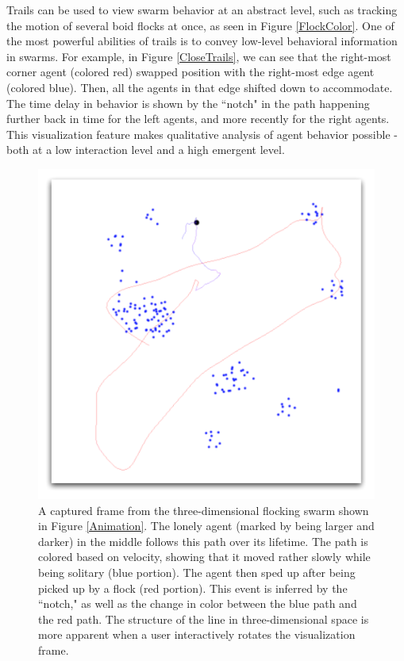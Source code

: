 \documentclass[conference]{IEEEtran}
\begin{document}
Trails can be used to view swarm behavior at an abstract level, such as tracking the motion of several boid
flocks at once, as seen in Figure \ref{FlockColor}.
One of the most powerful abilities of trails is to convey low-level behavioral information in swarms. For example,
in Figure \ref{CloseTrails}, we can see that the right-most corner agent (colored red) swapped position with the right-most
edge agent (colored blue). Then, all the agents in that edge shifted down to accommodate.
The time delay in behavior is shown by the ``notch" in the path happening further back in time for the left agents, and more recently for the right agents.
This visualization feature makes qualitative analysis of agent behavior possible - both at a low interaction level
and a high emergent level.







\begin{figure}
\centering
\includegraphics[scale=.4]{images/track.pdf}
\caption{
A captured frame from the three-dimensional flocking swarm shown in Figure \ref{Animation}.
The lonely agent (marked by being larger and darker) in the middle follows this path over its lifetime.
The path is colored based on velocity, showing that it moved rather slowly while being solitary (blue portion).
The agent then sped up after being picked up by a flock (red portion). This event is inferred by the ``notch,"
as well as the change in color between the blue path and the red path.
The structure of the line in three-dimensional space is more apparent when a user interactively rotates the visualization frame.}
\label{Track}
\end{figure}
\end{document}

